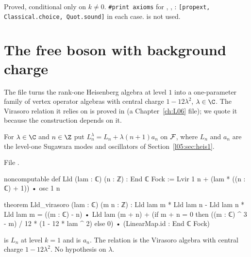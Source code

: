 \begin{status}
Proved, conditional only on $k\ne0$. \texttt{\#print axioms} for
, ,
: \texttt{[propext, Classical.choice, Quot.sound]} in each case.
 is not used.
\end{status}

\section{The free boson with background charge}\label{l05:sec:bg}

The file  turns the rank-one
Heisenberg algebra at level $1$ into a one-parameter family of vertex operator algebras with central charge
$1-12\lambda^2$, $\lambda\in\C$. The Virasoro relation it relies on is proved in
 (a Chapter~\ref{ch:L06} file); we quote it
because the construction depends on it.

\begin{definition}\label{l05:def:Lld}
For $\lambda\in\C$ and $n\in\Z$ put $L^\lambda_n=L_n+\lambda(n+1)a_n$ on $\mathcal{F}$, where $L_n$ and $a_n$ are the
level-one Sugawara modes and oscillators of Section~\ref{l05:sec:heis1}.
\end{definition}

\noindent File .
\begin{leancode}
noncomputable def Lld (lam : ℂ) (n : ℤ) : End ℂ Fock :=
  Lvir 1 n + (lam * ((n : ℂ) + 1)) • osc 1 n

theorem Lld_virasoro (lam : ℂ) (m n : ℤ) :
    Lld lam m * Lld lam n - Lld lam n * Lld lam m
      = ((m : ℂ) - n) • Lld lam (m + n)
        + (if m + n = 0 then ((m : ℂ) ^ 3 - m) / 12 * (1 - 12 * lam ^ 2) else 0)
            • (LinearMap.id : End ℂ Fock)
\end{leancode}

\begin{dictionary}
 is $L_n$ at level $k=1$ and  is $a_n$. The relation is the Virasoro algebra
with central charge $1-12\lambda^2$. No hypothesis on $\lambda$.
\end{dictionary}


